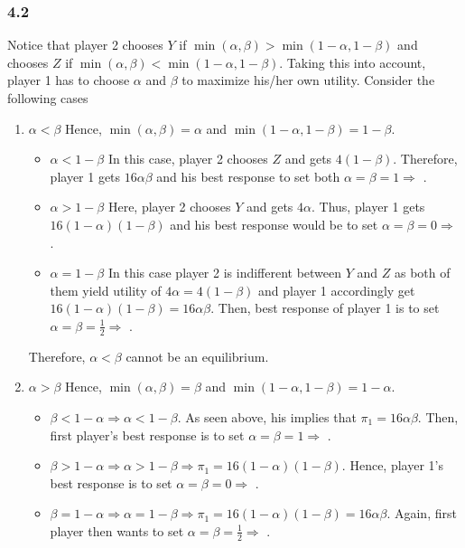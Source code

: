 \documentclass[]{article}
\begin{document}
 \subsubsection*{4.2}
Notice that player 2 chooses $Y$ if $\min(\alpha, \beta) > \min(1 - \alpha, 1 - \beta)$ and chooses $Z$ if $\min(\alpha, \beta) < \min(1 - \alpha, 1 - \beta)$. Taking this into account, player 1 has to choose $\alpha$ and $\beta$ to maximize his/her own utility. Consider the following cases
\begin{enumerate}[label=\alph*)]
	\item $\alpha < \beta$
	Hence, $\min(\alpha,\beta) = \alpha$ and $\min(1 - \alpha, 1 - \beta) = 1 - \beta$.
	\begin{itemize}
		\item $\alpha < 1 - \beta$
		In this case, player 2 chooses $Z$ and gets $4(1 - \beta)$. Therefore, player 1 gets $16\alpha\beta$ and his best response to set both $\alpha = \beta = 1 \Rightarrow$ \Lightning.
		\item $\alpha > 1 - \beta$
		Here, player 2 chooses $Y$ and gets $4\alpha$. Thus, player 1 gets $16(1 - \alpha)(1 - \beta)$ and his best response would be to set $\alpha = \beta = 0 \Rightarrow$ \Lightning.
		\item $\alpha = 1 - \beta$
		In this case player 2 is indifferent between $Y$ and $Z$ as both of them yield utility of $4\alpha = 4(1 - \beta)$ and player 1 accordingly get $16(1 - \alpha)(1 - \beta) = 16\alpha\beta$. Then, best response of player 1 is to set $\alpha = \beta = \frac{1}{2} \Rightarrow$ \Lightning.
	\end{itemize}
	Therefore, $\alpha < \beta$ cannot be an equilibrium.
	\item $\alpha > \beta$
	Hence, $\min(\alpha,\beta) = \beta$ and $\min(1 - \alpha, 1 - \beta) = 1 - \alpha$.
	\begin{itemize}
		\item $\beta < 1 - \alpha \Longrightarrow \alpha < 1 - \beta$. As seen above, his implies that $\pi_1 = 16\alpha\beta$. Then, first player's best response is to set $\alpha = \beta = 1 \Rightarrow$ \Lightning.
		\item $\beta > 1 - \alpha \Longrightarrow \alpha > 1 - \beta \Longrightarrow \pi_1 = 16(1 - \alpha)(1 - \beta)$. Hence, player 1's best response is to set $\alpha = \beta = 0 \Rightarrow$ \Lightning.
		\item $\beta = 1 - \alpha \Longrightarrow \alpha = 1 - \beta \Longrightarrow \pi_1 = 16(1 - \alpha)(1 - \beta) = 16\alpha\beta$. Again, first player then wants to set $\alpha = \beta = \frac{1}{2} \Rightarrow$ \Lightning.

\end{itemize}
\end{enumerate}
\end{document}
